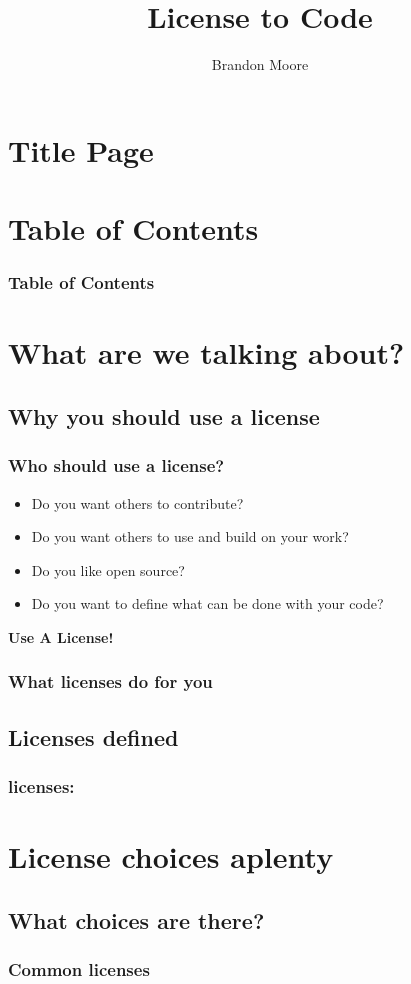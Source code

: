 \documentclass{beamer}
\begin{document}
	\title{License to Code}
	\author{Brandon Moore}
	\date{}
	\section{Title Page}
	\frame{\titlepage}
	\section{Table of Contents}
	\begin{frame}
		\frametitle{Table of Contents}
		\tableofcontents[]
	\end{frame}
	\section{What are we talking about?}
	\subsection{Why you should use a license}
	\begin{frame}
		\frametitle{Who should use a license?}
		\pause
		\begin{itemize}[<+->]
			\item Do you want others to contribute?
			\item Do you want others to use and build on your work?
			\item Do you like open source?
			\item Do you want to define what can be done with your code?
		\end{itemize}
		\pause
		\center\LARGE\textbf{Use A License!}
	\end{frame}
	\begin{frame}
		\frametitle{What licenses do for you}
		
	\end{frame}
	\subsection{Licenses defined}
	\begin{frame}
		\frametitle{licenses:}
		
	\end{frame}
	\section{License choices aplenty}
	\subsection{What choices are there?}
	\begin{frame}
		\frametitle{Common licenses}
	\end{frame}
\end{document}
